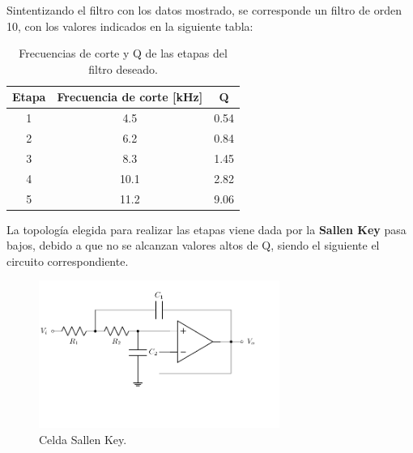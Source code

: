 Sintentizando el filtro con los datos mostrado, se corresponde un filtro de orden 10, con los valores indicados en la siguiente tabla:
\begin{table}[H]
\centering
\begin{tabular}{ccc}
\hline
\textbf{Etapa} & \textbf{Frecuencia de corte [kHz]} & \textbf{Q} \\ \hline
1 & 4.5 & 0.54 \\
2 & 6.2 & 0.84 \\
3 & 8.3 & 1.45 \\
4 & 10.1 & 2.82 \\
5 & 11.2 & 9.06 \\ \hline
\end{tabular}
\caption{Frecuencias de corte y Q de las etapas del filtro deseado.}
\end{table}

La topología elegida para realizar las etapas viene dada por la \textbf{Sallen Key} pasa bajos, debido a que no se alcanzan valores altos de Q, siendo el siguiente el circuito correspondiente.
\begin{figure}[H]
\centering
	\includegraphics[width=0.7\textwidth]{ImagenesEjercicio2/SK.pdf}
	\caption{Celda Sallen Key.}
	\label{fig:SK}
\end{figure}

